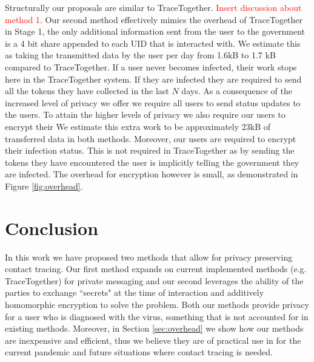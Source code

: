 \documentclass{article}
\newcommand\david[1]{\textcolor{red}{#1}}
\begin{document}
Structurally our proposals are similar to TraceTogether. \david{Insert discussion about method 1}. Our second method effectively mimics the overhead of TraceTogether in Stage 1, the only additional information sent from the user to the government is a 4 bit share appended to each UID that is interacted with. We estimate this as taking the transmitted data by the user per day from 1.6kB to 1.7 kB compared to TraceTogether. If a user never becomes infected, their work stops here in the TraceTogether system. If they are infected they are required to send all the tokens they have collected in the last $N$ days. As a consequence of the increased level of privacy we offer we require all users to send status updates to the users. To attain the higher levels of privacy we also require our users to encrypt their  We estimate this extra work to be approximately 23kB of transferred data in both methods. Moreover, our users are required to encrypt their infection status. This is not required in TraceTogether as by sending the tokens they have encountered the user is implicitly telling the government they are infected. The overhead for encryption however is small, as demonstrated in Figure \ref{fig:overhead}.
\fi
\section{Conclusion}

In this work we have proposed two methods that allow for privacy preserving contact tracing. Our first method expands on current implemented methods (e.g. TraceTogether) for private messaging and our second leverages the ability of the parties to exchange ``secrets" at the time of interaction and additively homomorphic encryption to solve the problem. Both our methods provide privacy for a user who is diagnosed with the virus, something that is not accounted for in existing methods. Moreover, in Section \ref{sec:overhead} we show how our methods are inexpensive and efficient, thus we believe they are of practical use in for the current pandemic and future situations where contact tracing is needed.



\end{document}
